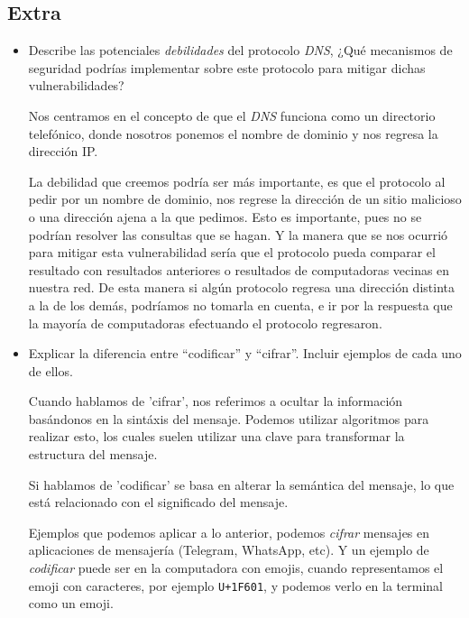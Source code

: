 \documentclass[spanish,12pt,letterpaper]{article}
\begin{document}
\subsection{Extra}
\begin{itemize}
\item Describe las potenciales \textit{debilidades} del protocolo \textit{DNS},
  ¿Qué mecanismos de seguridad podrías implementar sobre este protocolo para
  mitigar dichas vulnerabilidades?

  Nos centramos en el concepto de que el \textit{DNS} funciona como un directorio
  telefónico, donde nosotros ponemos el nombre de dominio y nos regresa la
  dirección IP.

  La debilidad que creemos podría ser más importante, es que el protocolo al
  pedir por un nombre de dominio, nos regrese la dirección de un sitio malicioso
  o una dirección ajena a la que pedimos. Esto es importante, pues no se podrían
  resolver las consultas que se hagan. Y la manera que se nos ocurrió para
  mitigar esta vulnerabilidad sería que el protocolo pueda comparar el resultado
  con resultados anteriores o resultados de computadoras vecinas en nuestra red.
  De esta manera si algún protocolo regresa una dirección distinta a la de los
  demás, podríamos no tomarla en cuenta, e ir por la respuesta que la mayoría de
  computadoras efectuando el protocolo regresaron.

  
\item Explicar la diferencia entre ``codificar'' y ``cifrar''. Incluir ejemplos
  de cada uno de ellos.

  Cuando hablamos de 'cifrar', nos referimos a ocultar la información basándonos
  en la sintáxis del mensaje. Podemos utilizar algoritmos para realizar esto, los
  cuales suelen utilizar una clave para transformar la estructura del mensaje.

  Si hablamos de 'codificar' se basa en alterar la semántica del mensaje, lo que
  está relacionado con el significado del mensaje.

  Ejemplos que podemos aplicar a lo anterior, podemos \textit{cifrar} mensajes en
  aplicaciones de mensajería (Telegram, WhatsApp, etc). Y un ejemplo de \textit{
    codificar} puede ser en la computadora con emojis, cuando representamos el
  emoji con caracteres, por ejemplo \texttt{U+1F601}, y podemos verlo en la
  terminal como un emoji.
\end{itemize}
\end{document}
